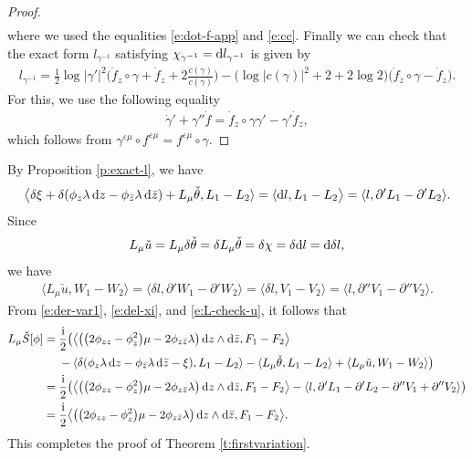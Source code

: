 \documentclass[pdftex]{sigma}%
\numberwithin{equation}{section}
\newcommand{\pa}{\partial}
\newcommand{\vep}{\varepsilon}
\begin{document}
\begin{proof}
\begin{align*}
\end{align*}
where we used the equalities \eqref{e:dot-f-app} and \eqref{e:cc}.
Finally we can check that the exact form $l_{\gamma^{-1}}$ satisfying $\chi_{\gamma^{-1}}= {\rm d}l_{\gamma^{-1}}$
is given by
\begin{gather*}
l_{\gamma^{-1}}=\frac{1}{2}\log|\gamma'|^2\bigg(\dot{f}_z\circ\gamma +\dot{f}_z+2\frac{\dot{c}(\gamma)}{c(\gamma)}\bigg)
-\big(\log|c(\gamma)|^2+2+2\log 2\big)\big(\dot{f}_z\circ\gamma-\dot{f}_z\big).
\end{gather*}
For this, we use the following equality
\begin{gather*}
\dot{\gamma}' +\gamma'' \dot{f} = \dot{f}_z\circ \gamma \gamma' -\gamma' \dot{f}_z,
\end{gather*}
which follows from $\gamma^{\vep\mu}\circ f^{\vep\mu}= f^{\vep\mu} \circ \gamma$.
\end{proof}


By Proposition \ref{p:exact-l}, we have
\begin{gather}\label{e:del-xi}
\big\langle \delta\xi+\delta(\phi_z \lambda \,{\rm d}z - \phi_{\bar{z}} \lambda\, {\rm d}\bar{z}) +L_{\mu}\check{\theta}, L_1-L_2 \rangle =\langle {\rm d}l, L_1-L_2\big\rangle
=\langle l, \pa'L_1- \pa'L_2 \rangle.
\end{gather}
Since
\begin{gather*}
L_{\mu}\check{u}=L_{\mu}\delta \check{\theta}=\delta L_{\mu}\check{\theta}
=\delta \chi=\delta {\rm d}l={\rm d}\delta l,
\end{gather*}
we have
\begin{gather}\label{e:L-check-u}
\langle L_{\mu}\check{u}, W_1-W_2\rangle
=\langle\delta l, \pa'W_1-\pa'W_2\rangle
=\langle\delta l, V_1-V_2 \rangle
=\langle l, \pa''V_1-\pa''V_2 \rangle.
\end{gather}
From \eqref{e:der-var1}, \eqref{e:del-xi}, and \eqref{e:L-check-u}, it follows that
\begin{align*}
L_{\mu}\check{S}[\phi]
={}&\frac{\rm i}{2}\bigl(\big\langle \big(\big(2\phi_{zz}-\phi^2_z\big)\mu -2\phi_{z\bar{z}} \lambda\big)\, {\rm d}z\wedge {\rm d}\bar{z}, F_1-F_2 \big\rangle
\\
& -\langle \delta(\phi_z \lambda \,{\rm d}z - \phi_{\bar{z}} \lambda\, {\rm d}\bar{z} - \xi), L_1-L_2 \rangle -\langle L_{\mu}\check{\theta}, L_1-L_2 \rangle+\langle L_{\mu}\check{u}, W_1-W_2 \rangle\bigr)
\\
={}& \frac{\rm i}{2}\bigl(\big\langle \big(\big(2\phi_{zz}-\phi^2_z\big)\mu -2\phi_{z\bar{z}} \lambda \big)\, {\rm d}z\wedge {\rm d}\bar{z}, F_1-F_2 \big\rangle-\langle l, \pa'L_1-\pa'L_2-\pa''V_1+\pa''V_2 \rangle\bigr)
\\
={}&\frac{\rm i}{2}\big\langle \big(\big(2\phi_{zz}-\phi^2_z\big)\mu -2\phi_{z\bar{z}} \lambda \big)\, {\rm d}z\wedge {\rm d}\bar{z}, F_1-F_2 \big\rangle.
\end{align*}
This completes the proof of Theorem \ref{t:firstvariation}.
\end{document}
